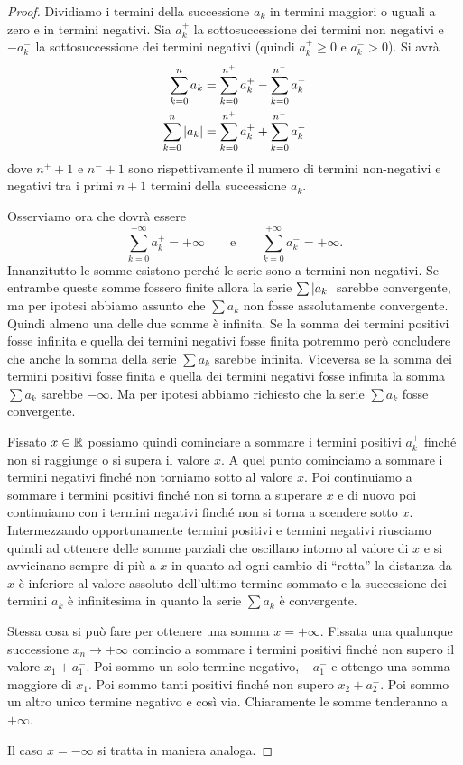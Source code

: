 \begin{proof}
Dividiamo i termini della successione $a_k$ in termini maggiori o uguali a zero
e in termini negativi. Sia $a^+_k$ la sottosuccessione dei termini non negativi
e $-a^-_k$ la sottosuccessione
dei termini negativi (quindi $a^+_k\ge 0$ e $a^-_k > 0$). Si avrà
\begin{align*}
  \sum_{k=0}^n a_k &= \sum_{k=0}^{n^+} a^+_k - \sum_{k=0}^{n^-} a^-_k \\
  \sum_{k=0}^n {\left|a_k\right|} &= \sum_{k=0}^{n^+} a^+_k + \sum_{k=0}^{n^-} a^-_k
\end{align*}
dove $n^+ +1$ e $n^-+1$ sono rispettivamente
il numero di termini non-negativi e negativi
tra i primi $n+1$ termini della successione $a_k$.

Osserviamo ora che dovrà essere
\[
\sum_{k=0}^{+\infty} a_k^+ = +\infty \qquad \text{e} \qquad
\sum_{k=0}^{+\infty} a_k^- = +\infty.
\]
Innanzitutto le somme esistono perché le serie sono a termini non negativi.
Se entrambe queste somme fossero finite allora la serie $\sum{\left|a_k\right|}$ sarebbe convergente, ma per ipotesi abbiamo assunto che $\sum a_k$ non fosse
assolutamente convergente.
Quindi almeno una delle due somme è infinita. Se la somma dei termini positivi
fosse infinita e quella dei termini negativi fosse finita potremmo però
concludere che anche la somma della serie $\sum a_k$ sarebbe infinita.
Viceversa se la somma dei termini positivi fosse finita e quella dei termini
negativi fosse infinita la somma $\sum a_k$ sarebbe $-\infty$. Ma per ipotesi
abbiamo richiesto che la serie $\sum a_k$ fosse convergente.

Fissato $x\in {\mathbb R}$ possiamo quindi cominciare a sommare i termini positivi
$a^+_k$ finché non si raggiunge o si supera il valore $x$. A quel punto cominciamo a sommare i termini negativi finché non torniamo sotto al valore $x$.
Poi continuiamo a sommare i termini positivi finché non si torna a superare $x$
e di nuovo poi continuiamo con i termini negativi finché non si torna a scendere
sotto $x$. Intermezzando opportunamente termini positivi e termini negativi
riusciamo quindi ad ottenere delle somme parziali che oscillano intorno al valore 
di $x$ e si avvicinano sempre di più a $x$ in quanto ad ogni cambio di ``rotta'' 
la distanza da $x$ è inferiore al valore assoluto dell'ultimo termine sommato 
e la successione dei termini $a_k$ è infinitesima in quanto la serie $\sum a_k$ è convergente.

Stessa cosa si può fare per ottenere una somma $x=+\infty$. Fissata una qualunque
successione $x_n \to +\infty$ comincio a sommare i termini positivi finché non supero il valore $x_1+a_1^-$. 
Poi sommo un solo termine negativo, $-a_1^-$ e ottengo una somma maggiore di $x_1$. 
Poi sommo tanti positivi finché non supero $x_2+a_2^-$. 
Poi sommo un altro unico termine negativo e così via. 
Chiaramente le somme tenderanno a $+\infty$.

Il caso $x=-\infty$ si tratta in maniera analoga.
\end{proof}

